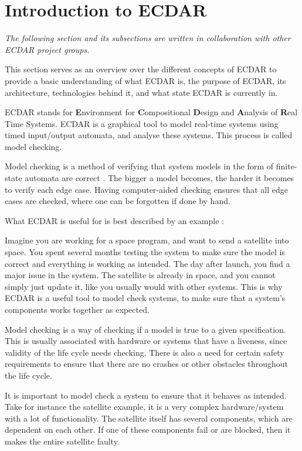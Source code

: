 \section{Introduction to ECDAR}\label{sec:introduction-to-ecdar}
\textit{The following section and its subsections are written in collaboration with other ECDAR project groups.}\vspace{1em}

This section serves as an overview over the different concepts of ECDAR to provide a basic understanding of what ECDAR is, the purpose of ECDAR, its architecture, technologies behind it, and what state ECDAR is currently in.

ECDAR stands for \textbf{E}nvironment for \textbf{C}ompositional \textbf{D}esign and \textbf{A}nalysis of \textbf{R}eal Time Systems.
ECDAR is a graphical tool to model real-time systems using timed input/output automata, and analyse these systems. 
This process is called model checking. 

Model checking is a method of verifying that system models in the form of finite-state automata are correct \cite{modelchecking-handbook}. 
The bigger a model becomes, the harder it becomes to verify each edge case. 
Having computer-aided checking ensures that all edge cases are checked, where one can be forgotten if done by hand.

What ECDAR is useful for is best described by an example \label{ECDAR:satellite}:

Imagine you are working for a space program, and want to send a satellite into space.
You spent several months testing the system to make sure the model is correct and everything is working as intended.
The day after launch, you find a major issue in the system.
The satellite is already in space, and you cannot simply just update it, like you usually would with other systems. 
This is why ECDAR is a useful tool to model check systems, to make sure that a system's components works together as expected.

Model checking is a way of checking if a model is true to a given specification.
This is usually associated with hardware or systems that have a liveness, since validity of the life cycle needs checking.
There is also a need for certain safety requirements to ensure that there are no crashes or other obstacles throughout the life cycle.

It is important to model check a system to ensure that it behaves as intended.
Take for instance the satellite example, it is a very complex hardware/system with a lot of functionality.
The satellite itself has several components, which are dependent on each other.
If one of these components fail or are blocked, then it makes the entire satellite faulty.

